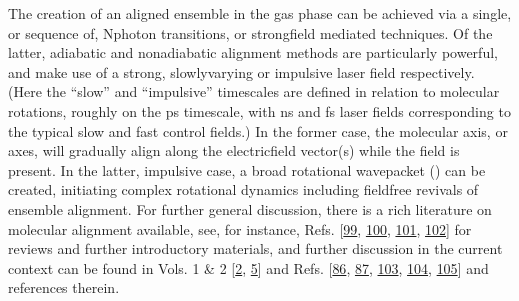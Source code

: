 \documentclass[letterpaper,table,10pt,english]{jupyterBook}
\begin{document}
\sphinxAtStartPar
The creation of an aligned ensemble in the gas phase can be achieved via a single, or sequence of, N\sphinxhyphen{}photon transitions, or strong\sphinxhyphen{}field mediated techniques. Of the latter, adiabatic and non\sphinxhyphen{}adiabatic alignment methods are particularly powerful, and make use of a strong, slowly\sphinxhyphen{}varying or impulsive laser field respectively. (Here the “slow” and “impulsive” time\sphinxhyphen{}scales are defined in relation to molecular rotations, roughly on the ps time\sphinxhyphen{}scale, with ns and fs laser fields corresponding to the typical slow and fast control fields.) In the former case, the molecular axis, or axes, will gradually align along the electric\sphinxhyphen{}field vector(s) while the field is present. In the latter, impulsive case, a broad rotational wavepacket ({\hyperref[\detokenize{backmatter/glossary:term-RWP}]{}}) can be created, initiating complex rotational dynamics including field\sphinxhyphen{}free revivals of ensemble alignment. For further general discussion, there is a rich literature on molecular alignment available, see, for instance, Refs. {[}\hyperlink{cite.backmatter/bibliography:id883}{99}, \hyperlink{cite.backmatter/bibliography:id634}{100}, \hyperlink{cite.backmatter/bibliography:id711}{101}, \hyperlink{cite.backmatter/bibliography:id980}{102}{]} for reviews and further introductory materials, and further discussion in the current context can be found in  Vols. 1 \& 2 {[}\hyperlink{cite.backmatter/bibliography:id663}{2}, \hyperlink{cite.backmatter/bibliography:id664}{5}{]} and Refs. {[}\hyperlink{cite.backmatter/bibliography:id821}{86}, \hyperlink{cite.backmatter/bibliography:id916}{87}, \hyperlink{cite.backmatter/bibliography:id815}{103}, \hyperlink{cite.backmatter/bibliography:id816}{104}, \hyperlink{cite.backmatter/bibliography:id653}{105}{]} and references therein.
\end{document}
